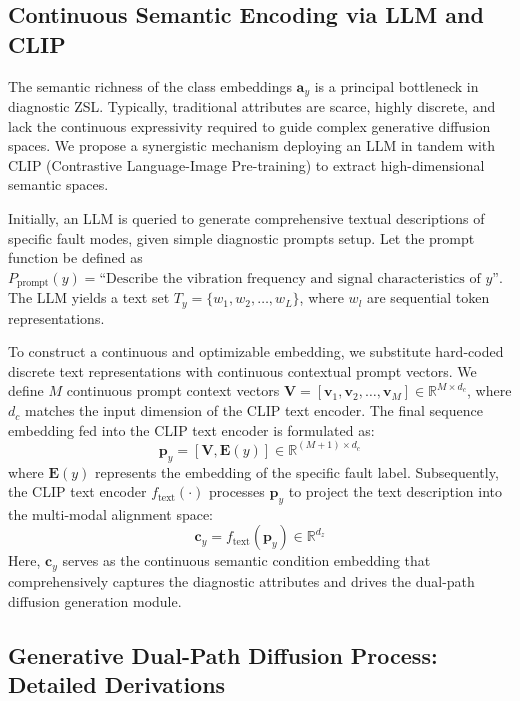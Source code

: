 \subsection{Continuous Semantic Encoding via LLM and CLIP}
\label{subsec:continuous_semantic}

The semantic richness of the class embeddings $\mathbf{a}_y$ is a principal bottleneck in diagnostic ZSL. Typically, traditional attributes are scarce, highly discrete, and lack the continuous expressivity required to guide complex generative diffusion spaces. We propose a synergistic mechanism deploying an LLM in tandem with CLIP (Contrastive Language-Image Pre-training) to extract high-dimensional semantic spaces.

Initially, an LLM is queried to generate comprehensive textual descriptions of specific fault modes, given simple diagnostic prompts setup. Let the prompt function be defined as $P_{\text{prompt}}(y) = \text{“Describe the vibration frequency and signal characteristics of } y \text{”}$. The LLM yields a text set $T_y = \{w_1, w_2, \dots, w_L\}$, where $w_l$ are sequential token representations. 

To construct a continuous and optimizable embedding, we substitute hard-coded discrete text representations with continuous contextual prompt vectors. We define $M$ continuous prompt context vectors $\mathbf{V} = [\mathbf{v}_1, \mathbf{v}_2, \dots, \mathbf{v}_M] \in \mathbb{R}^{M \times d_c}$, where $d_c$ matches the input dimension of the CLIP text encoder. The final sequence embedding fed into the CLIP text encoder is formulated as:
\begin{equation}\label{eq:clip_prompt}
\mathbf{p}_y = [\mathbf{V}, \mathbf{E}(y)] \in \mathbb{R}^{(M+1) \times d_c}
\end{equation}
where $\mathbf{E}(y)$ represents the embedding of the specific fault label. Subsequently, the CLIP text encoder $f_{\text{text}}(\cdot)$ processes $\mathbf{p}_y$ to project the text description into the multi-modal alignment space:
\begin{equation}\label{eq:clip_encoded}
\mathbf{c}_y = f_{\text{text}}(\mathbf{p}_y) \in \mathbb{R}^{d_z}
\end{equation}
Here, $\mathbf{c}_y$ serves as the continuous semantic condition embedding that comprehensively captures the diagnostic attributes and drives the dual-path diffusion generation module.

\subsection{Generative Dual-Path Diffusion Process: Detailed Derivations}
\label{subsec:diffusion_process}

